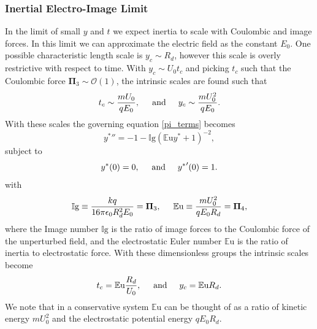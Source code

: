 \documentclass[aip,reprint, floatfix]{revtex4-1}
\begin{document}
\subsubsection{Inertial Electro-Image Limit}
In the limit of small $y$ and $t$ we expect inertia to scale with Coulombic and image forces. In this limit we can approximate the electric field as the constant $E_0$. One possible characteristic length scale is $y_c \sim R_d$, however this scale is overly restrictive with respect to time. With $y_c \sim U_0 t_c$ and picking $t_c$ such that the Coulombic force $\mathbf{\Pi}_3 \sim \mathcal{O}(1)$, the intrinsic scales are found such that
\[ t_c \sim \frac{m U_0}{q E_0}, \hspace{5 mm} \mbox{and} \hspace{5 mm} 
y_c \sim \frac{m U_0^2}{q E_0} .
\]
With these scales the governing equation \ref{pi_terms} becomes
\begin{equation}
{y^*}'' = -1 - \mathbb{I}\mbox{g} \left( \mathbb{E}\mbox{u}{y^*} + 1 \right)^{-2} , \label{img_limit}
\end{equation}
subject to
\begin{equation*}
{y^*}(0) = 0, \hspace{5 mm} \mbox{and} \hspace{5 mm} {y^*}'(0) = 1 .
\end{equation*}
with 
\[ \mathbb{I}\mbox{g} \equiv \frac{k q}{16 \pi \epsilon_0 R_d^2 E_0} = \mathbf{\Pi}_3, \hspace{5 mm}
\mathbb{E}\mbox{u} \equiv \frac{m U_0^2}{q E_0 R_d} = \mathbf{\Pi}_4 ,
\]
where the Image number $\mathbb{I}\mbox{g}$ is the ratio of image forces to the Coulombic force of the unperturbed field, and the electrostatic Euler number $\mathbb{E}\mbox{u}$ is the ratio of inertia to electrostatic force. With these dimensionless groups the intrinsic scales become
\[ t_c = \mathbb{E}\mbox{u} \frac{R_d}{U_0}, \hspace{5 mm} \mbox{and} \hspace{5 mm}
y_c = \mathbb{E}\mbox{u} R_d.
\]
We note that in a conservative system $\mathbb{E}\mbox{u}$ can be thought of as a ratio of kinetic energy $m U_0^2$ and the electrostatic potential energy $q E_0 R_d$.
\end{document}
